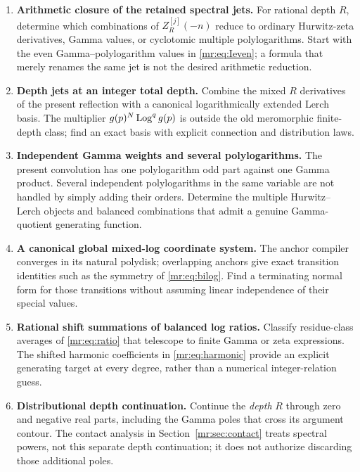 \documentclass[11pt,letterpaper]{article}
\theoremstyle{definition}\newtheorem{definition}[theorem]{Definition}
\theoremstyle{remark}\newtheorem{remark}[theorem]{Remark}
\begin{document}
\begin{enumerate}[label=Q\arabic*.]
\item \textbf{Arithmetic closure of the retained spectral jets.}
For rational depth $R$, determine which combinations of
$Z_R^{[j]}(-n)$ reduce to ordinary Hurwitz-zeta derivatives, Gamma
values, or cyclotomic multiple polylogarithms. Start with the even
Gamma--polylogarithm values in \eqref{mr:eq:Ieven}; a formula that
merely renames the same jet is not the desired arithmetic reduction.

\item \textbf{Depth jets at an integer total depth.}
Combine the mixed $R$ derivatives of the present reflection with a
canonical logarithmically extended Lerch basis. The multiplier
$g(p)^N\operatorname{Log}^q g(p)$ is outside the old meromorphic finite-depth class;
find an exact basis with explicit connection and distribution laws.

\item \textbf{Independent Gamma weights and several polylogarithms.}
The present convolution has one polylogarithm odd part against one
Gamma product. Several independent polylogarithms in the same variable
are not handled by simply adding their orders. Determine the multiple
Hurwitz--Lerch objects and balanced combinations that admit a genuine
Gamma-quotient generating function.

\item \textbf{A canonical global mixed-log coordinate system.}
The anchor compiler converges in its natural polydisk; overlapping
anchors give exact transition identities such as the symmetry of
\eqref{mr:eq:bilog}. Find a terminating normal form for those
transitions without assuming linear independence of their special values.

\item \textbf{Rational shift summations of balanced log ratios.}
Classify residue-class averages of \eqref{mr:eq:ratio} that telescope
to finite Gamma or zeta expressions. The shifted harmonic coefficients
in \eqref{mr:eq:harmonic} provide an explicit generating target at
every degree, rather than a numerical integer-relation guess.

\item \textbf{Distributional depth continuation.}
Continue the \emph{depth} $R$ through zero and negative real parts,
including the Gamma poles that cross its argument contour. The contact
analysis in Section~\ref{mr:sec:contact} treats spectral powers, not
this separate depth continuation; it does not authorize discarding
those additional poles.


\end{enumerate}
\end{document}

